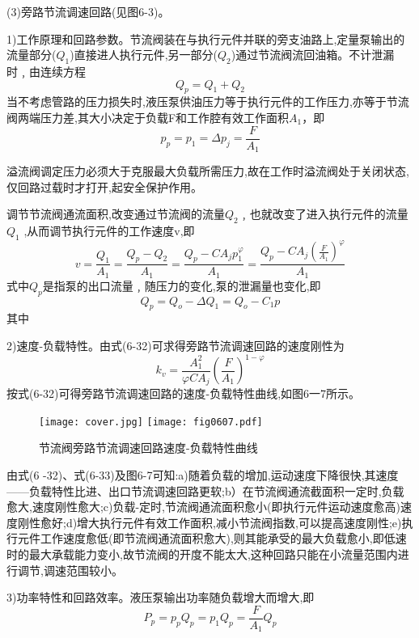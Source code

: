 (3)旁路节流调速回路(见图6-3)。

1)工作原理和回路参数。节流阀装在与执行元件并联的旁支油路上,定量泵输出的流量部分($Q_1$)直接进人执行元件,另一部分($Q_2$)通过节流阀流回油箱。不计泄漏时﹐由连续方程
$$
Q_p=Q_1+Q_2
$$
当不考虑管路的压力损失时,液压泵供油压力等于执行元件的工作压力,亦等于节流阀两端压力差,其大小决定于负载F和工作腔有效工作面积$A_1$，即
$$
p_p=p_1=\varDelta p_j=\frac{F}{A_1}
$$

溢流阀调定压力必须大于克服最大负载所需压力,故在工作时溢流阀处于关闭状态,仅回路过载时才打开,起安全保护作用。

调节节流阀通流面积,改变通过节流阀的流量$Q_2$﹐也就改变了进入执行元件的流量$Q_1$ ,从而调节执行元件的工作速度v,即
$$
v=\frac{Q_1}{A_1}=\frac{Q_p-Q_2}{A_1}=\frac{Q_p-CA_jp_{1}^{\varphi}}{A_1}=\frac{Q_p-CA_j\left( \frac{F}{A_1} \right) ^{\varphi}}{A_1}
$$
式中$Q_p$是指泵的出口流量﹐随压力的变化,泵的泄漏量也变化,即
$$
Q_p=Q_o-\varDelta Q_1=Q_o-C_1p
$$
其中 \quad
{}

2)速度-负载特性。由式(6-32)可求得旁路节流调速回路的速度刚性为
$$
k_v=\frac{A_{1}^{2}}{\varphi CA_j}\left( \frac{F}{A_1} \right) ^{1-\varphi}
$$
按式(6-32)可得旁路节流调速回路的速度-负载特性曲线,如图6一7所示。

\begin{figure}
\centering
\ifOpenSource
\texttt{[image: cover.jpg]}   %
\else 
\texttt{[image: fig0607.pdf]}  %
\fi
\caption{节流阀旁路节流调速回路速度-负载特性曲线}
\label{fig:fig0607}
\end{figure}

由式(6 -32)、式(6-33)及图6-7可知:a)随着负载的增加,运动速度下降很快,其速度——负载特性比进、出口节流调速回路更软;b）在节流阀通流截面积一定时,负载愈大,速度刚性愈大;c)负载-定时,节流阀通流面积愈小(即执行元件运动速度愈高)速度刚性愈好;d)增大执行元件有效工作面积,减小节流阀指数,可以提高速度刚性;e)执行元件工作速度愈低(即节流阀通流面积愈大),则其能承受的最大负载愈小,即低速时的最大承载能力变小,故节流阀的开度不能太大,这种回路只能在小流量范围内进行调节,调速范围较小。

3)功率特性和回路效率。液压泵输出功率随负载增大而增大,即
$$
P_p=p_pQ_p=p_1Q_p=\frac{F}{A_1}Q_p
$$

